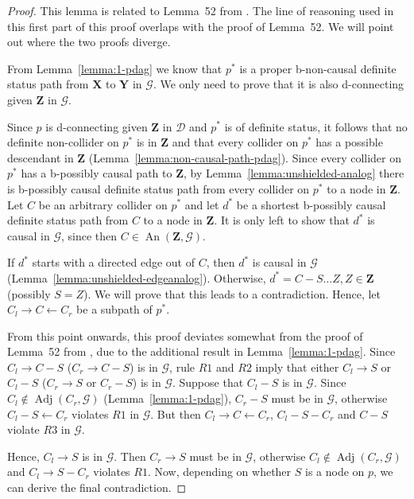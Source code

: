 \documentclass[letterpaper]{article}
\theoremstyle{definition}
\theoremstyle{remark}
\DeclareMathOperator{\An}{An}
\DeclareMathOperator{\Adj}{Adj}
\newcommand{\g}[1][G]{\mathcal{#1}}
\newcommand{\pstar}[1][p]{{#1}^{*}}
\begin{document}
\begin{proof}
This lemma is related to Lemma~52 from \cite{perkovic16}. The line of reasoning used in this first part of this proof overlaps with the proof of Lemma~52. We will point out where the two proofs diverge.

From Lemma~\ref{lemma:1-pdag} we know that $\pstar$ is a proper b-non-causal definite status path from $\mathbf{X}$ to $\mathbf{Y}$ in $\g$.
We only need to prove that it is also d-connecting given $\mathbf{Z}$ in $\g$. 

Since $p$ is d-connecting given $\mathbf{Z}$ in $\g[D]$ and $\pstar$ is of definite status, it follows that no definite non-collider on $\pstar$ is in $\mathbf{Z}$ and that every collider on $\pstar$ has a possible descendant in $\mathbf{Z}$ (Lemma~\ref{lemma:non-causal-path-pdag}). Since every collider on $\pstar$ has a b-possibly causal path to $\mathbf{Z}$, by Lemma~\ref{lemma:unshielded-analog} there is b-possibly causal definite status path from every collider on $\pstar$ to a node in $\mathbf{Z}$. Let $C$ be an arbitrary collider on $\pstar$ and let $\pstar[d]$ be a shortest b-possibly causal definite status path from $C$ to a node in $\mathbf{Z}$. It is only left to show that $\pstar[d]$ is causal in $\g$, since then $C \in \An(\mathbf{Z},\g)$.

If $\pstar[d]$ starts with a directed edge out of $C$, then $\pstar[d]$ is causal in $\g$ (Lemma~\ref{lemma:unshielded-edgeanalog}). Otherwise, $\pstar[d] = C - S \dots Z, Z \in \mathbf{Z}$ (possibly $S=Z$). We will prove that this leads to a contradiction.
Hence, let $ C_{l} \rightarrow C \leftarrow C_{r}$ be a subpath of $\pstar$. 

From this point onwards, this proof deviates somewhat from the proof of Lemma~52 from \cite{perkovic16}, due to the additional result in Lemma~\ref{lemma:1-pdag}.
Since $C_l \rightarrow C - S$ ($C_r \rightarrow C - S$) is in $\g$, rule $R1$ and $R2$ imply that either $C_l \rightarrow S$ or $C_l -S$ ($C_r \rightarrow S$ or $C_r -S$) is in $\g$. Suppose that $C_l - S$ is in $\g$. Since $C_l \notin \Adj(C_r,\g)$ (Lemma~\ref{lemma:1-pdag}), $C_r - S$ must be in $\g$, otherwise $C_l - S \leftarrow C_r$ violates $R1$ in $\g$. But then $C_l \rightarrow C \leftarrow C_r$, $C_l -S -C_r$ and $C -S$ violate $R3$ in $\g$. 

Hence, $C_l \rightarrow S$ is in $\g$. Then $C_r \rightarrow S$ must be in $\g$, otherwise $C_l \notin \Adj(C_r,\g)$ and $C_l \rightarrow S - C_r$ violates $R1$. Now, depending on whether $S$ is a node on $p$, we can derive the final contradiction.


\end{proof}
\end{document}
